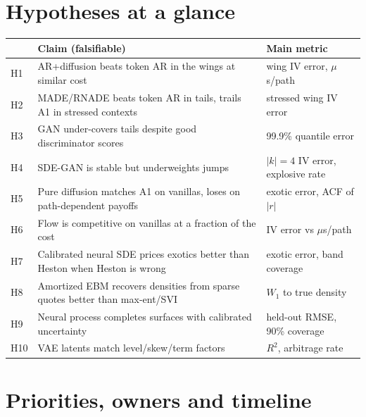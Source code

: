 \documentclass[10pt]{article}
\begin{document}
\section{Hypotheses at a glance}
\begin{table}[h]
\centering\small
\begin{tabularx}{\linewidth}{@{}l L l@{}}
\toprule
& \textbf{Claim (falsifiable)} & \textbf{Main metric}\\
\midrule
H1 & AR+diffusion beats token AR in the wings at similar cost & wing IV error, $\mu$s/path\\
H2 & MADE/RNADE beats token AR in tails, trails A1 in stressed contexts & stressed wing IV error\\
H3 & GAN under-covers tails despite good discriminator scores & 99.9\% quantile error\\
H4 & SDE-GAN is stable but underweights jumps & $|k|=4$ IV error, explosive rate\\
H5 & Pure diffusion matches A1 on vanillas, loses on path-dependent payoffs & exotic error, ACF of $|r|$\\
H6 & Flow is competitive on vanillas at a fraction of the cost & IV error vs $\mu$s/path\\
H7 & Calibrated neural SDE prices exotics better than Heston when Heston is wrong & exotic error, band coverage\\
H8 & Amortized EBM recovers densities from sparse quotes better than max-ent/SVI & $W_1$ to true density\\
H9 & Neural process completes surfaces with calibrated uncertainty & held-out RMSE, 90\% coverage\\
H10 & VAE latents match level/skew/term factors & $R^2$, arbitrage rate\\
\bottomrule
\end{tabularx}
\end{table}

\section{Priorities, owners and timeline}\label{sec:priorities}
\end{document}
